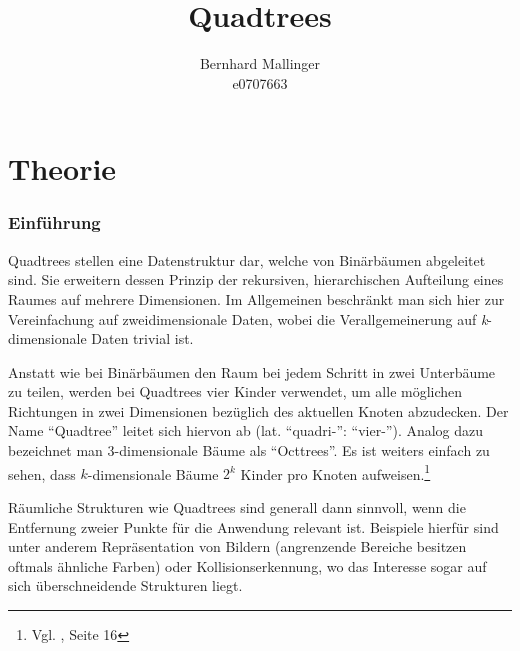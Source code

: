 \documentclass[%
			paper=a4,%
			DIV12,
			draft=false,%
			titlepage
			]{scrartcl}
\title{Quadtrees}
\author{Bernhard Mallinger \\ e0707663}
\newcommand{\zit}[3]{#1 \cite{#2}, #3}
\newcommand{\footzit}[3]{\footnote{\zit{#1}{#2}{#3}}}
\begin{document}
\maketitle

\tableofcontents 

\newpage

%
%
%
%
%
%
%


\part{Theorie}
\section{Einführung}
Quadtrees stellen eine Datenstruktur dar, welche von Binärbäumen abgeleitet sind. Sie erweitern dessen Prinzip der rekursiven, hierarchischen Aufteilung eines Raumes auf mehrere Dimensionen. 
Im Allgemeinen beschränkt man sich hier zur Vereinfachung auf zweidimensionale Daten, wobei die Verallgemeinerung auf \textit{k}-dimensionale Daten trivial ist.

Anstatt wie bei Binärbäumen den Raum bei jedem Schritt in zwei Unterbäume zu teilen, werden bei Quadtrees vier Kinder verwendet, um alle möglichen Richtungen in zwei Dimensionen bezüglich des aktuellen Knoten abzudecken. Der Name "`Quadtree"' leitet sich hiervon ab (lat. "`quadri-"': "`vier-"'). 
Analog dazu bezeichnet man 3-dimensionale Bäume als "`Octtrees"'. Es ist weiters einfach zu sehen, dass $k$-dimensionale Bäume $2^k$ Kinder pro Knoten aufweisen.\footzit{Vgl.}{Bentley:1979}{Seite 16}

Räumliche Strukturen wie Quadtrees sind generall dann sinnvoll, wenn die Entfernung zweier Punkte für die Anwendung relevant ist. Beispiele hierfür sind unter anderem Repräsentation von Bildern (angrenzende Bereiche besitzen oftmals ähnliche Farben) oder Kollisionserkennung, wo das Interesse sogar auf sich überschneidende Strukturen liegt.
\end{document}

